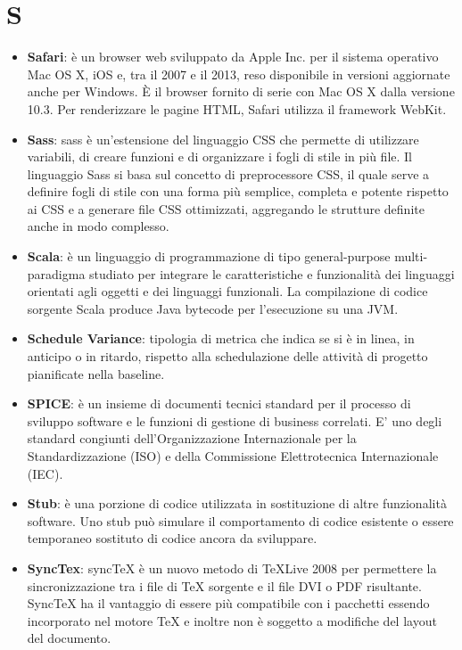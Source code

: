 \section{S}
\begin{itemize} 
	\item
	\textbf{Safari}: è un browser web sviluppato da Apple Inc. per il sistema operativo Mac OS X, iOS e, tra il 2007 e il 2013, reso disponibile in versioni aggiornate anche per Windows. È il browser fornito di serie con Mac OS X dalla versione 10.3. Per renderizzare le pagine HTML, Safari utilizza il framework WebKit.
	\item
	\textbf{Sass}: sass è un'estensione del linguaggio CSS che permette di utilizzare variabili, di creare funzioni e di organizzare i fogli di stile in più file. Il linguaggio Sass si basa sul concetto di preprocessore CSS, il quale serve a definire fogli di stile con una forma più semplice, completa e potente rispetto ai CSS e a generare file CSS ottimizzati, aggregando le strutture definite anche in modo complesso.
	\item
	\textbf{Scala}: è un linguaggio di programmazione di tipo general-purpose multi-paradigma studiato per integrare le caratteristiche e funzionalità dei linguaggi orientati agli oggetti e dei linguaggi funzionali. La compilazione di codice sorgente Scala produce Java bytecode per l'esecuzione su una JVM.
	\item
	\textbf{Schedule Variance}: tipologia di metrica che indica se si è in linea, in anticipo o in ritardo, rispetto alla schedulazione delle attività di progetto pianificate nella baseline.
	\item 
	\textbf{SPICE}: è un insieme di documenti tecnici standard per il processo di sviluppo software e le funzioni di gestione di business correlati. E' uno degli standard congiunti dell'Organizzazione Internazionale per la Standardizzazione (ISO) e della Commissione Elettrotecnica Internazionale (IEC).
	\item
	\textbf{Stub}:  è una porzione di codice utilizzata in sostituzione di altre funzionalità software. Uno stub può simulare il comportamento di codice esistente o essere temporaneo sostituto di codice ancora da sviluppare. 
	\item
	\textbf{SyncTex}: syncTeX è un nuovo metodo di TeXLive 2008 per permettere la sincronizzazione tra i file di TeX sorgente e il file DVI o PDF risultante. SyncTeX ha il vantaggio di essere più compatibile con i pacchetti essendo incorporato nel motore TeX e inoltre non è soggetto a modifiche del layout del documento.
\end{itemize}